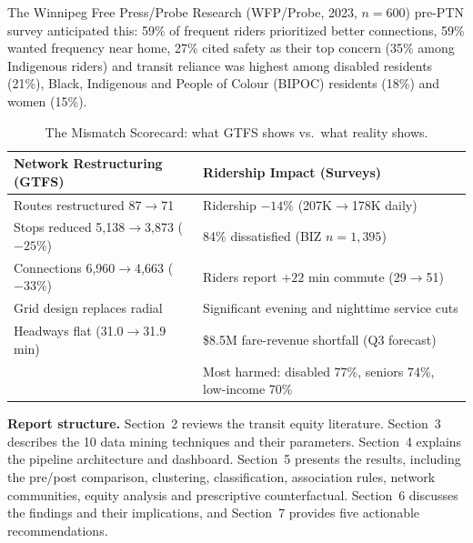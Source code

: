 \documentclass[11pt]{article}
\begin{document}
The Winnipeg Free Press/Probe Research (WFP/Probe, 2023, $n=600$) pre-PTN survey anticipated this: 59\% of frequent riders prioritized better connections, 59\% wanted frequency near home, 27\% cited safety as their top concern (35\% among Indigenous riders) and transit reliance was highest among disabled residents (21\%), Black, Indigenous and People of Colour (BIPOC) residents (18\%) and women (15\%).

\begin{table}[H]
\centering\footnotesize
\caption{The Mismatch Scorecard: what GTFS shows vs.\ what reality shows.}
\label{tab:mismatch}
\begin{tabularx}{\textwidth}{@{}XX@{}}
\toprule
\textbf{Network Restructuring (GTFS)} & \textbf{Ridership Impact (Surveys)} \\
\midrule
Routes restructured 87$\to$71 & Ridership $-14\%$ (207K$\to$178K daily) \\
Stops reduced 5{,}138$\to$3{,}873 ($-25\%$) & 84\% dissatisfied (BIZ $n=1{,}395$) \\
Connections 6{,}960$\to$4{,}663 ($-33\%$) & Riders report $+22$ min commute (29$\to$51) \\
Grid design replaces radial & Significant evening and nighttime service cuts \\
Headways flat (31.0$\to$31.9 min) & \$8.5M fare-revenue shortfall (Q3 forecast) \\
 & Most harmed: disabled 77\%, seniors 74\%, low-income 70\% \\
\bottomrule
\end{tabularx}
\end{table}

\textbf{Report structure.} Section~2 reviews the transit equity literature. Section~3 describes the 10 data mining techniques and their parameters. Section~4 explains the pipeline architecture and dashboard. Section~5 presents the results, including the pre/post comparison, clustering, classification, association rules, network communities, equity analysis and prescriptive counterfactual. Section~6 discusses the findings and their implications, and Section~7 provides five actionable recommendations.

\end{document}
